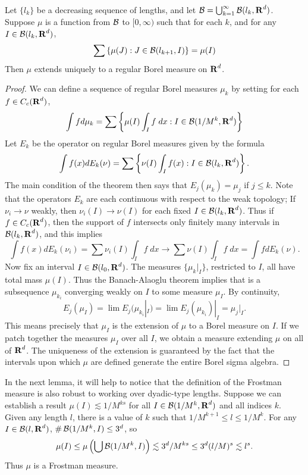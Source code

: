 \begin{lemma}
	Let $\{ l_k \}$ be a decreasing sequence of lengths, and let $\operatorname{\mathcal{B}} = \bigcup_{k = 1}^\infty \operatorname{\mathcal{B}}(l_k,\operatorname{\mathbf{R}}^d)$. Suppose $\mu$ is a function from $\operatorname{\mathcal{B}}$ to $[0,\infty)$ such that for each $k$, and for any $I \in \operatorname{\mathcal{B}}(l_k,\operatorname{\mathbf{R}}^d)$,
	\[ \sum \left\{ \mu(J) : J \in \operatorname{\mathcal{B}}(l_{k+1},I) \right\} = \mu(I) \]
	Then $\mu$ extends uniquely to a regular Borel measure on $\operatorname{\mathbf{R}}^d$.
\end{lemma}
\begin{proof}
	We can define a sequence of regular Borel measures $\mu_k$ by setting for each $f \in C_c(\operatorname{\mathbf{R}}^d)$,
	\[ \int f d\mu_k = \sum \left\{ \mu(I) \int_I f\; dx : I \in \operatorname{\mathcal{B}}(1/M^k,\operatorname{\mathbf{R}}^d) \right\} \]
	Let $E_k$ be the operator on regular Borel measures given by the formula
	\[ \int f(x) dE_k(\nu) = \sum \left\{ \nu(I) \int_I f(x) : I \in \operatorname{\mathcal{B}}(l_k,\operatorname{\mathbf{R}}^d) \right\}. \]
	The main condition of the theorem then says that $E_j(\mu_k) = \mu_j$ if $j \leq k$. Note that the operators $E_k$ are each continuous with respect to the weak topology; If $\nu_i \to \nu$ weakly, then $\nu_i(I) \to \nu(I)$ for each fixed $I \in \operatorname{\mathcal{B}}(l_k,\operatorname{\mathbf{R}}^d)$. Thus if $f \in C_c(\operatorname{\mathbf{R}}^d)$, then the support of $f$ intersects only finitely many intervals in $\operatorname{\mathcal{B}}(l_k,\operatorname{\mathbf{R}}^d)$, and this implies
	\[ \int f(x) dE_k(\nu_i) = \sum \nu_i(I) \int_I f\; dx \to \sum \nu(I) \int_I f\; dx = \int f dE_k(\nu). \]
	Now fix an interval $I \in \operatorname{\mathcal{B}}(l_0,\operatorname{\mathbf{R}}^d)$. The measures $\{ \mu_k|_I \}$, restricted to $I$, all have total mass $\mu(I)$. Thus the Banach-Alaoglu theorem implies that is a subsequence $\mu_{k_i}$ converging weakly on $I$ to some measure $\mu_I$. By continuity,
	\[ E_j(\mu_I) = \lim E_j(\mu_{k_i}|_I) = \lim E_j(\mu_{k_i})|_I = \mu_j|_I. \]
	This means precisely that $\mu_I$ is the extension of $\mu$ to a Borel measure on $I$. If we patch together the measures $\mu_I$ over all $I$, we obtain a measure extending $\mu$ on all of $\operatorname{\mathbf{R}}^d$. The uniqueness of the extension is guaranteed by the fact that the intervals upon which $\mu$ are defined generate the entire Borel sigma algebra.
\end{proof}

In the next lemma, it will help to notice that the definition of the Frostman measure is also robust to working over dyadic-type lengths. Suppose we can establish a result $\mu(I) \lesssim 1/M^{ks}$ for all $I \in \operatorname{\mathcal{B}}(1/M^k,\operatorname{\mathbf{R}}^d)$ and all indices $k$. Given any length $l$, there is a value of $k$ such that $1/M^{k+1} \leq l \leq 1/M^k$. For any $I \in \operatorname{\mathcal{B}}(l,\operatorname{\mathbf{R}}^d)$, $\# \operatorname{\mathcal{B}}(1/M^k,I) \leq 3^d$, so
%
\[ \mu(I) \leq \mu \left(\bigcup \operatorname{\mathcal{B}}(1/M^k,I) \right) \lesssim 3^d/M^{ks} \leq 3^d(l/M)^s \lesssim l^s. \]
%
Thus $\mu$ is a Frostman measure.

